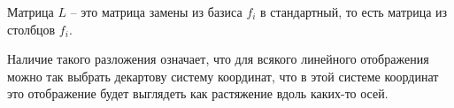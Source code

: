 Матрица $L$ -- это матрица замены из базиса $f_i$ в стандартный, то есть матрица из столбцов $f_i$.

\endproof
\ethrm

Наличие такого разложения означает, что для всякого линейного отображения можно так выбрать декартову систему координат, что в этой системе координат это отображение будет выглядеть как растяжение вдоль каких-то осей.
